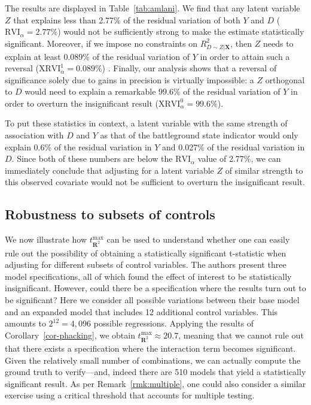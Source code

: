\documentclass[sts]{imsart}
\theoremstyle{plain}
\theoremstyle{definition}
\newcommand{\tmax}{t_{\boldsymbol{R}^2}^{\max}}
\newcommand{\Rd}{R^2_{D\sim Z | \mathbf{X}}}
\newcommand{\XRVI}{\text{XRVI}}
\newcommand{\RVI}{\text{RVI}}
\begin{document}
The results are displayed in Table~\ref{tab:amlani}. We find that  any latent variable $Z$ that explains less than 2.77\% of the residual variation of both $Y$ and $D$ ($\RVI_{\alpha}=2.77\%$) would not be sufficiently strong to make the estimate statistically significant. Moreover, if we impose no constraints on $\Rd$, then $Z$  needs to explain at least 0.089\% of the residual variation of $Y$ in order to attain such a reversal ($\XRVI^1_{\alpha}=0.089\%$) . Finally, our analysis shows that a reversal of significance solely due to gains in precision is virtually impossible: a $Z$ orthogonal to $D$ would need to explain a remarkable $99.6$\% of the residual variation of $Y$   in order to overturn the insignificant result ($\XRVI^0_{\alpha}=99.6\%$).  

To put these statistics in context, a latent variable with the same strength of association with $D$ and $Y$ as that of the battleground state indicator would only explain 0.6\% of the residual variation in $Y$ and 0.027\% of the residual variation in $D$. Since both of these numbers are below the $\RVI_{\alpha}$ value of 2.77\%, we can immediately conclude that adjusting for a latent variable $Z$ of similar strength to this observed covariate would not be sufficient to overturn the insignificant result. 

\subsection{Robustness to subsets of controls}

We now illustrate how \(\tmax\) can be used to understand whether one can easily rule out the possibility of obtaining a statistically significant t-statistic when adjusting for different subsets of control variables. The authors present three model specifications, all of which found the effect of interest to be statistically insignificant. However, could there be a specification where the results turn out to be significant? Here we consider all possible variations between their base model and an expanded model that includes 12 additional control variables. This amounts to \(2^{12} = 4{,}096\) possible regressions. Applying the results of Corollary~\ref{cor-phacking}, we obtain \(\tmax \approx 20.7\), 
meaning that we cannot rule out that there exists a specification  where the interaction term becomes significant. Given the relatively small number of combinations, we can actually compute the ground truth to verify---and, indeed there are 510 models  that yield a statistically significant result. As per Remark~\ref{rmk:multiple}, one could also consider a similar exercise using a critical threshold that accounts for multiple testing.
\end{document}
